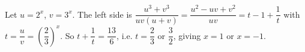 Let $u=2^x$, $v=3^x$. The left side is $\dfrac{u^3+v^3}{uv(u+v)}=\dfrac{u^2-uv+v^2}{uv}=t-1+\dfrac1t$ with $t=\dfrac uv=\left(\dfrac23\right)^x$. So $t+\dfrac1t=\dfrac{13}6$, i.e. $t=\dfrac23$ or $\dfrac32$, giving $\boxed{x=1\text{ or }x=-1}$.
